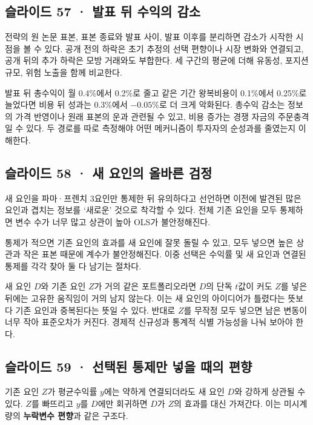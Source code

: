 \documentclass[11pt,a4paper]{article}
\begin{document}
\subsection{슬라이드 57 · 발표 뒤 수익의 감소}
전략의 원 논문 표본, 표본 종료와 발표 사이, 발표 이후를 분리하면 감소가 시작한 시점을 볼 수 있다. 공개 전의 하락은 초기 추정의 선택 편향이나 시장 변화와 연결되고, 공개 뒤의 추가 하락은 모방 거래와도 부합한다. 세 구간의 평균에 더해 유동성, 포지션 규모, 위험 노출을 함께 비교한다.\par

발표 뒤 총수익이 월 0.4\%에서 0.2\%로 줄고 같은 기간 왕복비용이 0.1\%에서 0.25\%로 늘었다면 비용 뒤 성과는 0.3\%에서 $-0.05\%$로 더 크게 악화된다. 총수익 감소는 정보의 가격 반영이나 원래 표본의 운과 관련될 수 있고, 비용 증가는 경쟁 자금의 주문충격일 수 있다. 두 경로를 따로 측정해야 어떤 메커니즘이 투자자의 순성과를 줄였는지 이해한다.\par

\subsection{슬라이드 58 · 새 요인의 올바른 검정}
새 요인을 파마·프렌치 3요인만 통제한 뒤 유의하다고 선언하면 이전에 발견된 많은 요인과 겹치는 정보를 ‘새로운’ 것으로 착각할 수 있다. 전체 기존 요인을 모두 통제하면 변수 수가 너무 많고 상관이 높아 OLS가 불안정해진다.\par

통제가 적으면 기존 요인의 효과를 새 요인에 잘못 돌릴 수 있고, 모두 넣으면 높은 상관과 작은 표본 때문에 계수가 불안정해진다. 이중 선택은 수익률 및 새 요인과 연결된 통제를 각각 찾아 둘 다 남기는 절차다.\par

새 요인 $D$와 기존 요인 $Z$가 거의 같은 포트폴리오라면 $D$의 단독 $t$값이 커도 $Z$를 넣은 뒤에는 고유한 움직임이 거의 남지 않는다. 이는 새 요인의 아이디어가 틀렸다는 뜻보다 기존 요인과 중복된다는 뜻일 수 있다. 반대로 $Z$를 무작정 모두 넣으면 남은 변동이 너무 작아 표준오차가 커진다. 경제적 신규성과 통계적 식별 가능성을 나눠 보아야 한다.\par

\subsection{슬라이드 59 · 선택된 통제만 넣을 때의 편향}
기존 요인 $Z$가 평균수익률 $y$에는 약하게 연결되더라도 새 요인 $D$와 강하게 상관될 수 있다. $Z$를 빠뜨리고 $y$를 $D$에만 회귀하면 $D$가 $Z$의 효과를 대신 가져간다. 이는 미시계량의 \textbf{누락변수 편향}과 같은 구조다.\par
\end{document}
